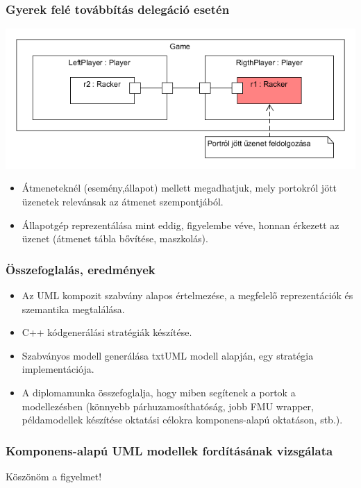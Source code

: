 \documentclass[11pt]{beamer}
\begin{document}
\begin{frame}
	\frametitle{Gyerek felé továbbítás delegáció esetén}
	\begin{center}
	\includegraphics[scale=0.5]{vedes_demo_recived_proc.png}
	\end{center}
	\begin{itemize}
	\item Átmeneteknél (esemény,állapot) mellett megadhatjuk, mely portokról jött üzenetek relevánsak az átmenet szempontjából.
	\item Állapotgép reprezentálása mint eddig, figyelembe véve, honnan érkezett az üzenet (átmenet tábla bővítése, maszkolás). 
	\end{itemize}
\end{frame}

\begin{frame}
	\frametitle{Összefoglalás, eredmények}
	\begin{itemize}
	\item Az UML kompozit szabvány alapos értelmezése, a megfelelő reprezentációk és szemantika megtalálása.
	\item C++ kódgenerálási stratégiák készítése.
	\item Szabványos modell generálása txtUML modell alapján, egy stratégia implementációja.
	\item A diplomamunka összefoglalja, hogy miben segítenek a portok a modellezésben (könnyebb párhuzamosíthatóság, jobb FMU wrapper, példamodellek készítése oktatási célokra komponens-alapú oktatáson, stb.).
	\end{itemize}
\end{frame}

\begin{frame}
	\frametitle{Komponens-alapú UML modellek fordításának vizsgálata}
	\begin{center}
		\Large{Köszönöm a figyelmet!}
	\end{center}
\end{frame}
\end{document}
